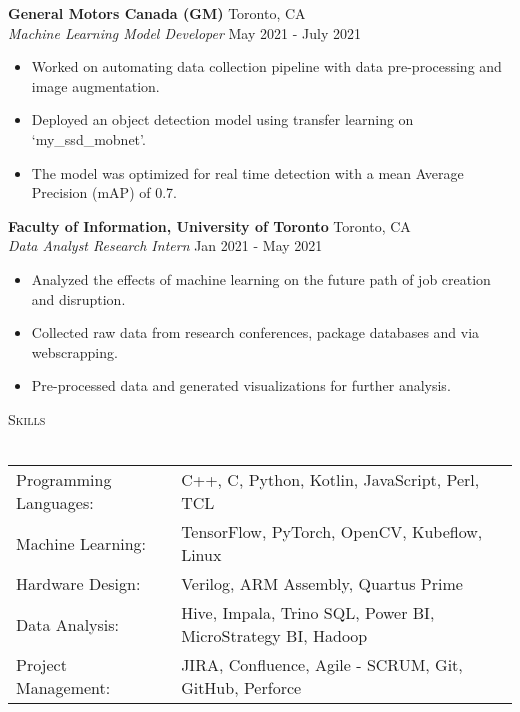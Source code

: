 \documentclass[a4paper]{article}
\newcommand{\lineunder} {
    \vspace*{-8pt} \\
    \hspace*{-18pt} \hrulefill \\
}
\newcommand{\header} [1] {
    {\hspace*{-18pt}\vspace*{6pt} \textsc{#1}}
    \vspace*{-6pt} \lineunder
}
\begin{document}
\textbf{General Motors Canada (GM)} \hfill Toronto, CA\\
\textit{Machine Learning Model Developer} \hfill May 2021 - July 2021\\
\vspace{-1mm}
\begin{itemize} \itemsep 1pt
	\item Worked on automating data collection pipeline with data pre-processing and image augmentation.
	\item Deployed an object detection model using transfer learning on ‘my\_ssd\_mobnet’.
	\item The model was optimized for real time detection with a mean Average Precision (mAP) of 0.7.
\end{itemize}

\textbf{Faculty of Information, University of Toronto} \hfill Toronto, CA\\
\textit{Data Analyst Research Intern} \hfill Jan 2021 - May 2021\\
\vspace{-1mm}
\begin{itemize} \itemsep 1pt
    \item Analyzed the effects of machine learning on the future path of job creation and disruption.
	\item Collected raw data from research conferences, package databases and via webscrapping.
    \item Pre-processed data and generated visualizations for further analysis.
\end{itemize}


\header{Skills}
\begin{tabular}{ l l }
	Programming Languages: & C++, C, Python, Kotlin, JavaScript, Perl, TCL                    \\
	Machine Learning:      & TensorFlow, PyTorch, OpenCV, Kubeflow, Linux                     \\
    Hardware Design:       & Verilog, ARM Assembly, Quartus Prime                             \\
	Data Analysis:         & Hive, Impala, Trino SQL, Power BI, MicroStrategy BI, Hadoop      \\
	Project Management:    & JIRA, Confluence, Agile - SCRUM, Git, GitHub, Perforce           \\                               
\end{tabular}
\vspace{2mm}
\end{document}
